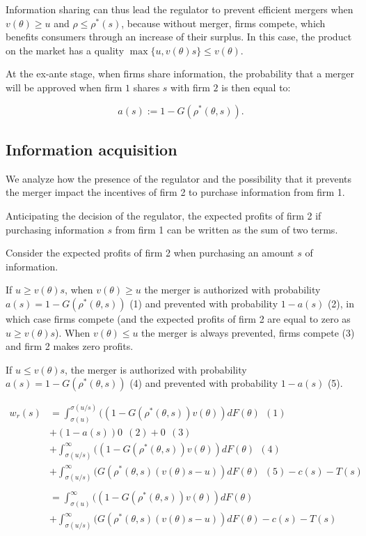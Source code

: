 \documentclass[a4paper,leqno]{article}%
\renewcommand{\t}{\theta}
\newcommand{\s}{\sigma}
\begin{document}
Information sharing can thus lead the regulator to prevent efficient mergers when $v(\t)\geq u$ and $\rho \leq \rho^*(s)$, because without merger, firms compete, which benefits consumers through an increase of their surplus. In this case, the product on the market has a quality $\max\{u,v(\t)s\}\leq v(\t)$.

At the ex-ante stage, when firms share information, the probability that a merger will be approved when firm $1$ shares $s$ with firm $2$ is then equal to:

\[
a(s):=1-G(\rho^*(\t,s)).
\]


\subsection{Information acquisition}

We analyze how the presence of the regulator and the possibility that it prevents the merger impact the incentives of firm 2 to purchase information from firm 1.

Anticipating the decision of the regulator, the expected profits of firm 2 if purchasing information $s$ from firm 1 can be written as the sum of two terms. 


Consider the expected profits of firm 2 when purchasing an amount $s$ of information.

If $u\geq v(\t)s$, when $v(\t)\geq u$ the merger is authorized with probability $a(s)=1-G(\rho^*(\t,s))$ (1) and prevented with probability $1-a(s)$ (2), in which case firms compete (and the expected profits of firm 2 are equal to zero as $u\geq v(\t)s$). When $v(\t)\leq u$ the merger is always prevented, firms compete (3) and firm 2 makes zero profits.

If $u\leq v(\t)s$, the merger is authorized with probability $a(s)=1-G(\rho^*(\t,s))$ (4) and prevented with probability $1-a(s)$ (5). 


\begin{equation}
    \begin{aligned}
w_r(s)&=\int_{\s(u)}^{\s(u/s)}((1-G(\rho^*(\t,s))v(\t))dF(\t)~~(1)\\ 
    &+(1-a(s))0~~(2)+0~~(3)\\
    &+\int_{\s(u/s)}^{\infty}((1-G(\rho^*(\t,s))v(\t))dF(\t)~~(4)\\
    &+\int_{\s(u/s)}^\infty (G(\rho^*(\t,s)(v(\t)s-u))dF(\t)~~(5)-c(s)-T(s)\\
    &\\
    &=\int_{\s(u)}^{\infty}((1-G(\rho^*(\t,s))v(\t))dF(\t)\\
    &+\int_{\s(u/s)}^\infty (G(\rho^*(\t,s)(v(\t)s-u))dF(\t)-c(s)-T(s)\\
\end{aligned}
\end{equation}
\end{document}

